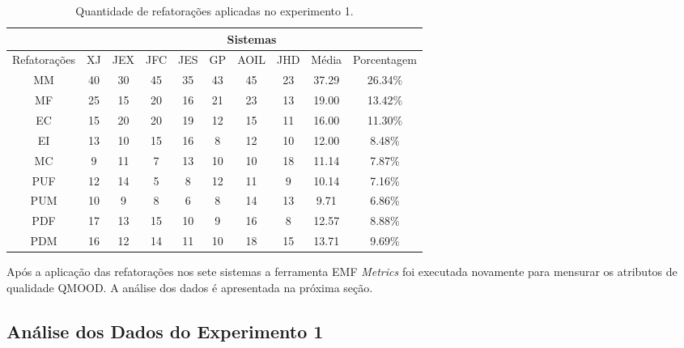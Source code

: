 \begin{table}[h]
\centering
\caption{Quantidade de refatorações aplicadas no experimento 1.}
\label{tab:experimento_dados_refatoracoes_aplicadas}
\begin{tabular}{c|c|c|c|c|c|c|c|c|c|}
\cline{2-10}
                                   & \multicolumn{9}{c|}{Sistemas}                                \\ \hline
\multicolumn{1}{|c|}{Refatorações} & XJ & JEX & JFC & JES & GP & AOIL & JHD & Média & Porcentagem \\ \hline
\multicolumn{1}{|c|}{MM}           & 40 & 30  & 45  & 35  & 43 & 45   & 23  & 37.29 & 26.34\%     \\ \hline
\multicolumn{1}{|c|}{MF}           & 25 & 15  & 20  & 16  & 21 & 23   & 13  & 19.00 & 13.42\%     \\ \hline
\multicolumn{1}{|c|}{EC}           & 15 & 20  & 20  & 19  & 12 & 15   & 11  & 16.00 & 11.30\%     \\ \hline
\multicolumn{1}{|c|}{EI}           & 13 & 10  & 15  & 16  & 8  & 12   & 10  & 12.00 & 8.48\%      \\ \hline
\multicolumn{1}{|c|}{MC}           & 9  & 11  & 7   & 13  & 10 & 10   & 18  & 11.14 & 7.87\%      \\ \hline
\multicolumn{1}{|c|}{PUF}          & 12 & 14  & 5   & 8   & 12 & 11   & 9   & 10.14 & 7.16\%      \\ \hline
\multicolumn{1}{|c|}{PUM}          & 10 & 9   & 8   & 6   & 8  & 14   & 13  & 9.71  & 6.86\%     \\ \hline
\multicolumn{1}{|c|}{PDF}          & 17 & 13  & 15  & 10  & 9  & 16   & 8   & 12.57 & 8.88\%      \\ \hline
\multicolumn{1}{|c|}{PDM}          & 16 & 12  & 14  & 11  & 10 & 18   & 15  & 13.71 & 9.69\%      \\ \hline
\end{tabular}
\end{table}


Após a aplicação das refatorações nos sete sistemas a ferramenta EMF \textit{Metrics} foi executada novamente para mensurar os atributos de qualidade QMOOD. A análise dos dados é apresentada na próxima seção.

\subsection{Análise dos Dados do Experimento 1}

